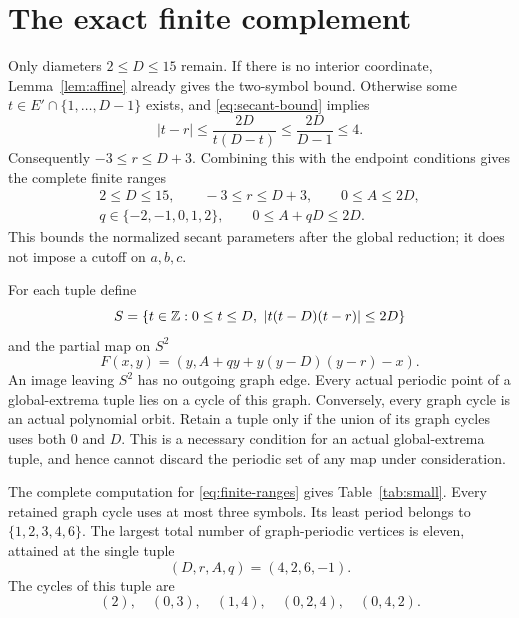 \section{The exact finite complement}
\label{sec:finite}

Only diameters $2\le D\le15$ remain. If there is no interior
coordinate, Lemma~\ref{lem:affine} already gives the two-symbol bound.
Otherwise some $t\in E'\cap\{1,\ldots,D-1\}$ exists, and
\eqref{eq:secant-bound} implies
\[
 |t-r|\le\frac{2D}{t(D-t)}
 \le\frac{2D}{D-1}\le4.
\]
Consequently $-3\le r\le D+3$. Combining this with the endpoint
conditions gives the complete finite ranges
\begin{equation}
 \begin{gathered}
 2\le D\le15,\qquad -3\le r\le D+3,\qquad 0\le A\le2D,\\
 q\in\{-2,-1,0,1,2\},\qquad 0\le A+qD\le2D.
 \end{gathered}
 \label{eq:finite-ranges}
\end{equation}
This bounds the normalized secant parameters after the global
reduction; it does not impose a cutoff on $a,b,c$.

For each tuple define
\begin{equation}
 S=\{t\in\mathbb{Z}:0\le t\le D,\ |t(t-D)(t-r)|\le2D\}
 \label{eq:small-symbols}
\end{equation}
and the partial map on $S^2$
\begin{equation}
 F(x,y)=(y,A+qy+y(y-D)(y-r)-x).
 \label{eq:small-graph}
\end{equation}
An image leaving $S^2$ has no outgoing graph edge. Every actual
periodic point of a global-extrema tuple lies on a cycle of this
graph. Conversely, every graph cycle is an actual polynomial orbit.
Retain a tuple only if the union of its graph cycles uses both $0$
and $D$. This is a necessary condition for an actual global-extrema
tuple, and hence cannot discard the periodic set of any map under
consideration.

\begin{proposition}
\label{prop:finite}
The complete computation for \eqref{eq:finite-ranges} gives
Table~\ref{tab:small}. Every retained graph cycle uses at most
three symbols. Its least period belongs to $\{1,2,3,4,6\}$.
The largest total number of graph-periodic vertices is eleven,
attained at the single tuple
\begin{equation}
 (D,r,A,q)=(4,2,6,-1).
 \label{eq:max-tuple}
\end{equation}
The cycles of this tuple are
\begin{equation}
 (2),\quad (0,3),\quad (1,4),\quad (0,2,4),\quad (0,4,2).
 \label{eq:max-words}
\end{equation}
\end{proposition}

